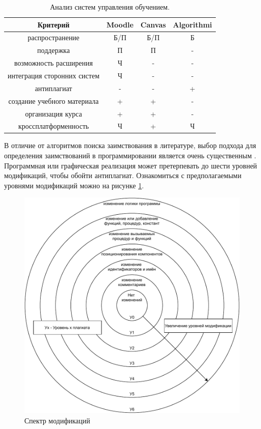 \begin{table}[h]
    \begin{center}
        \caption{Анализ систем управления обучением.}
        \label{tab:res}
        \begin{tabular}{|c|c|c|c|}
            \hline
            \bfseries Критерий &\bfseries Moodle & \bfseries Canvas & \bfseries Algorithmi \\
            \hline
            распространение & Б/П & Б/П & Б\\ \hline
            поддержка & П & П & - \\ \hline
            возможность расширения & Ч & - & - \\ \hline
            интеграция сторонних систем & Ч & -  & -\\ \hline
            антиплагиат & - & - & + \\ \hline
            создание учебного материала & + & + & - \\ \hline
			организация курса & + & + & - \\ \hline
			кроссплатформенность & Ч & + & Ч \\ \hline
        \end{tabular}
    \end{center}
\end{table}

В отличие от алгоритмов поиска заимствования в литературе, выбор подхода для определения заимствований в программировании является очень существенным \cite{antiplagiat-xml}. Программная или графическая реализация может претерпевать до шести уровней модификаций, чтобы обойти антиплагиат. Ознакомиться с предполагаемыми уровнями модификаций можно на рисунке \ref{fig:anti-levels}.

\begin{figure}[h!btp]
	\centering
	\includegraphics[width=\textwidth]{inc/levels.pdf}
	\caption{Спектр модификаций}
	\label{fig:anti-levels}	
\end{figure}

